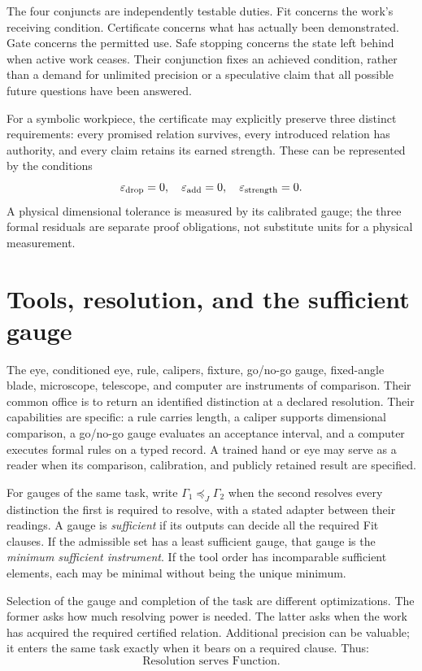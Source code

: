 \documentclass[11pt,letterpaper]{article}
\theoremstyle{definition}\newtheorem{definition}{Definition}
\begin{document}
The four conjuncts are independently testable duties. Fit concerns the work's receiving condition. Certificate concerns what has actually been demonstrated. Gate concerns the permitted use. Safe stopping concerns the state left behind when active work ceases. Their conjunction fixes an achieved condition, rather than a demand for unlimited precision or a speculative claim that all possible future questions have been answered.

For a symbolic workpiece, the certificate may explicitly preserve three distinct requirements: every promised relation survives, every introduced relation has authority, and every claim retains its earned strength. These can be represented by the conditions
\begin{equation}\label{eq:residuals}
\varepsilon_{\rm drop}=0,\quad
\varepsilon_{\rm add}=0,\quad
\varepsilon_{\rm strength}=0.
\end{equation}
A physical dimensional tolerance is measured by its calibrated gauge; the three formal residuals are separate proof obligations, not substitute units for a physical measurement.

\section{Tools, resolution, and the sufficient gauge}
The eye, conditioned eye, rule, calipers, fixture, go/no-go gauge, fixed-angle blade, microscope, telescope, and computer are instruments of comparison. Their common office is to return an identified distinction at a declared resolution. Their capabilities are specific: a rule carries length, a caliper supports dimensional comparison, a go/no-go gauge evaluates an acceptance interval, and a computer executes formal rules on a typed record. A trained hand or eye may serve as a reader when its comparison, calibration, and publicly retained result are specified.

For gauges of the same task, write $\Gamma_1\preceq_J\Gamma_2$ when the second resolves every distinction the first is required to resolve, with a stated adapter between their readings. A gauge is \emph{sufficient} if its outputs can decide all the required Fit clauses. If the admissible set has a least sufficient gauge, that gauge is the \emph{minimum sufficient instrument}. If the tool order has incomparable sufficient elements, each may be minimal without being the unique minimum.

Selection of the gauge and completion of the task are different optimizations. The former asks how much resolving power is needed. The latter asks when the work has acquired the required certified relation. Additional precision can be valuable; it enters the same task exactly when it bears on a required clause. Thus:
\begin{equation}\label{eq:resolution}
\boxed{\text{Resolution serves Function.}}
\end{equation}
\end{document}
